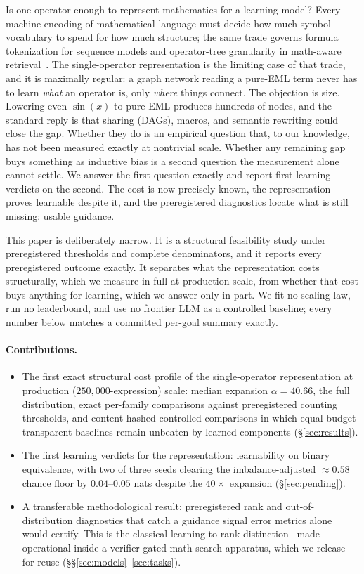 \documentclass[11pt]{article}
\begin{document}
Is one operator enough to represent mathematics for a learning model? Every
machine encoding of mathematical language must decide how much symbol
vocabulary to spend for how much structure; the same trade governs formula
tokenization for sequence models and operator-tree granularity in math-aware
retrieval~\cite{lample2020deep,mansouri2019tangentcft}. The single-operator
representation is the limiting case of that trade, and it is maximally regular:
a graph network reading a pure-EML term never has to learn \emph{what} an
operator is, only \emph{where} things connect. The objection is size. Lowering
even $\sin(x)$ to pure EML produces hundreds of nodes, and the standard reply
is that sharing (DAGs), macros, and semantic rewriting could close the gap.
Whether they do is an empirical question that, to our knowledge, has not been
measured exactly at nontrivial scale. Whether any remaining gap buys something
as inductive bias is a second question the measurement alone cannot settle. We
answer the first question exactly and report first learning verdicts on the
second. The cost is now precisely known, the representation proves learnable
despite it, and the preregistered diagnostics locate what is still missing:
usable guidance.

This paper is deliberately narrow. It is a structural feasibility study under
preregistered thresholds and complete denominators, and it reports every
preregistered outcome exactly. It separates what the representation costs
structurally, which we measure in full at production scale, from whether that
cost buys anything for learning, which we answer only in part. We fit no
scaling law, run no leaderboard, and use no frontier LLM as a controlled
baseline; every number below matches a committed per-goal summary exactly.

\paragraph{Contributions.}
\begin{itemize}
\item The first exact structural cost profile of the single-operator
representation at production ($250{,}000$-expression) scale: median expansion
$\alpha=40.66$, the full distribution, exact per-family comparisons against
preregistered counting thresholds, and content-hashed controlled comparisons
in which equal-budget transparent baselines remain unbeaten by learned
components (\S\ref{sec:results}).
\item The first learning verdicts for the representation: learnability on
binary equivalence, with two of three seeds clearing the imbalance-adjusted
${\approx}0.58$ chance floor by $0.04$--$0.05$ nats despite the $40\times$
expansion (\S\ref{sec:pending}).
\item A transferable methodological result: preregistered rank and
out-of-distribution diagnostics that catch a guidance signal error metrics
alone would certify. This is the classical learning-to-rank
distinction~\cite{burges2005learning} made operational inside a verifier-gated
math-search apparatus, which we release for reuse
(\S\S\ref{sec:models}--\ref{sec:tasks}).
\end{itemize}
\end{document}
